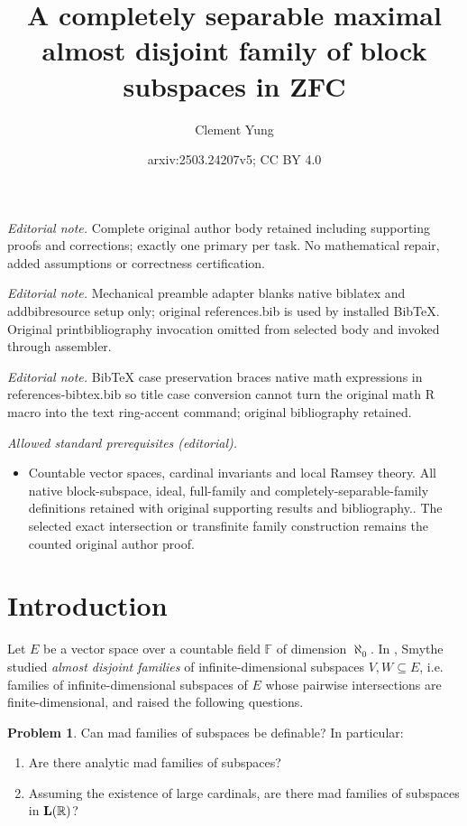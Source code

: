 \documentclass[10pt,a4paper]{amsart}
\title{A completely separable maximal almost disjoint family of block subspaces in ZFC}
\author{Clement Yung}
\date{arxiv:2503.24207v5; CC BY 4.0}
\theoremstyle{plain}
\numberwithin{equation}{section}
\theoremstyle{definition}
\newtheorem{prob}[theorem]{Problem}
\newcommand{\R}{\mathbb{R}}
\let\strokeL\L
\DeclareRobustCommand{\L}{\ifmmode\mathbf{L}\else\strokeL\fi}
\begin{document}
\maketitle
\noindent\textit{Editorial note.} Complete original author body retained including supporting proofs and corrections; exactly one primary per task. No mathematical repair, added assumptions or correctness certification.\par\medskip
\noindent\textit{Editorial note.} Mechanical preamble adapter blanks native biblatex and addbibresource setup only; original references.bib is used by installed BibTeX. Original printbibliography invocation omitted from selected body and invoked through assembler.\par\medskip
\noindent\textit{Editorial note.} BibTeX case preservation braces native math expressions in references-bibtex.bib so title case conversion cannot turn the original math R macro into the text ring-accent command; original bibliography retained.\par\medskip
\noindent\textit{Allowed standard prerequisites (editorial).}\begin{itemize}
\item Countable vector spaces, cardinal invariants and local Ramsey theory. All native block-subspace, ideal, full-family and completely-separable-family definitions retained with original supporting results and bibliography.. The selected exact intersection or transfinite family construction remains the counted original author proof.
\end{itemize}\medskip
\section{Introduction}
\label{sec:intro}


Let $E$ be a vector space over a countable field $\mathbb{F}$ of dimension $\aleph_0$. In \cite{S19}, Smythe studied \emph{almost disjoint families} of infinite-dimensional subspaces $V,W \subseteq E$, i.e. families of infinite-dimensional subspaces of $E$ whose pairwise intersections are finite-dimensional, and raised the following questions.
\begin{prob}
\label{prob:definable.mad.families}
    Can mad families of subspaces be definable? In particular:
    \begin{enumerate}
        \item Are there analytic mad families of subspaces?
        
        \item Assuming the existence of large cardinals, are there mad families of subspaces in $\L(\R)$?
    \end{enumerate}
\end{prob}
\end{document}
